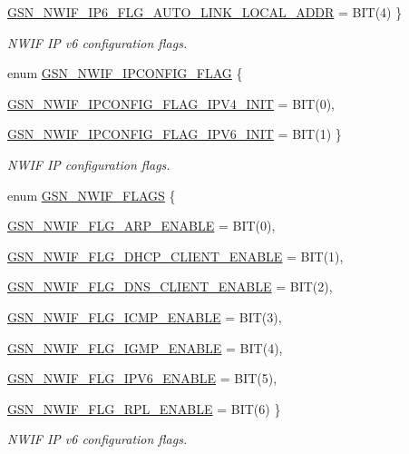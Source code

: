 \begin{DoxyCompactItemize}
\par
\hyperlink{a00670_gga283a80240d803667a00eb79d19d53fd6a22c3526ea733e9e3e571b9e47455ad14}{GSN\_\-NWIF\_\-IP6\_\-FLG\_\-AUTO\_\-LINK\_\-LOCAL\_\-ADDR} = BIT(4)
 \}
\begin{DoxyCompactList}\small\item\em NWIF IP v6 configuration flags. \end{DoxyCompactList}\item 
enum \hyperlink{a00670_gaa290d30cd14afde370ebe3cc0bc80713}{GSN\_\-NWIF\_\-IPCONFIG\_\-FLAG} \{ \par
\hyperlink{a00670_ggaa290d30cd14afde370ebe3cc0bc80713ad2faaf1e7aa840a7a5e6f0b87f771010}{GSN\_\-NWIF\_\-IPCONFIG\_\-FLAG\_\-IPV4\_\-INIT} =  BIT(0), 
\par
\hyperlink{a00670_ggaa290d30cd14afde370ebe3cc0bc80713aee3c914de355b83ae9273c0cf45f1fe3}{GSN\_\-NWIF\_\-IPCONFIG\_\-FLAG\_\-IPV6\_\-INIT} =  BIT(1)
 \}
\begin{DoxyCompactList}\small\item\em NWIF IP configuration flags. \end{DoxyCompactList}\item 
enum \hyperlink{a00670_gaa0ec94e77c73c9648888a870bd0f041a}{GSN\_\-NWIF\_\-FLAGS} \{ \par
\hyperlink{a00670_ggaa0ec94e77c73c9648888a870bd0f041aa9dc36bd7a233781adb8c75441c6179b8}{GSN\_\-NWIF\_\-FLG\_\-ARP\_\-ENABLE} =  BIT(0), 
\par
\hyperlink{a00670_ggaa0ec94e77c73c9648888a870bd0f041aa0666e123f6937fbd3deb7024c9f25236}{GSN\_\-NWIF\_\-FLG\_\-DHCP\_\-CLIENT\_\-ENABLE} =  BIT(1), 
\par
\hyperlink{a00670_ggaa0ec94e77c73c9648888a870bd0f041aae868de24a703223a0d1e00aa33f83531}{GSN\_\-NWIF\_\-FLG\_\-DNS\_\-CLIENT\_\-ENABLE} =  BIT(2), 
\par
\hyperlink{a00670_ggaa0ec94e77c73c9648888a870bd0f041aa349cb4e40a71e0a0419792354d68a10d}{GSN\_\-NWIF\_\-FLG\_\-ICMP\_\-ENABLE} =  BIT(3), 
\par
\hyperlink{a00670_ggaa0ec94e77c73c9648888a870bd0f041aaf1e3613168c79494813f43bd2fd779db}{GSN\_\-NWIF\_\-FLG\_\-IGMP\_\-ENABLE} =  BIT(4), 
\par
\hyperlink{a00670_ggaa0ec94e77c73c9648888a870bd0f041aa3d237bb1f68c4dc2e7c4774cd71ce30c}{GSN\_\-NWIF\_\-FLG\_\-IPV6\_\-ENABLE} =  BIT(5), 
\par
\hyperlink{a00670_ggaa0ec94e77c73c9648888a870bd0f041aa9291be9bc46fefc2f9309978d2211765}{GSN\_\-NWIF\_\-FLG\_\-RPL\_\-ENABLE} =  BIT(6)
 \}
\begin{DoxyCompactList}\small\item\em NWIF IP v6 configuration flags. \end{DoxyCompactList}\item 

\end{DoxyCompactItemize}
